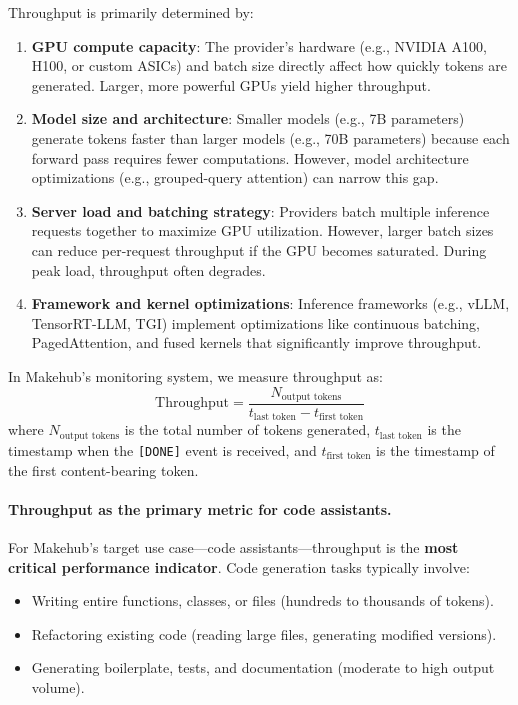 \documentclass[english]{article}
\begin{document}
Throughput is primarily determined by:
\begin{enumerate}
    \item \textbf{GPU compute capacity}: The provider's hardware (e.g., NVIDIA A100, H100, or custom ASICs) and batch size directly affect how quickly tokens are generated. Larger, more powerful GPUs yield higher throughput.
    \item \textbf{Model size and architecture}: Smaller models (e.g., 7B parameters) generate tokens faster than larger models (e.g., 70B parameters) because each forward pass requires fewer computations. However, model architecture optimizations (e.g., grouped-query attention) can narrow this gap.
    \item \textbf{Server load and batching strategy}: Providers batch multiple inference requests together to maximize GPU utilization. However, larger batch sizes can reduce per-request throughput if the GPU becomes saturated. During peak load, throughput often degrades.
    \item \textbf{Framework and kernel optimizations}: Inference frameworks (e.g., vLLM, TensorRT-LLM, TGI) implement optimizations like continuous batching, PagedAttention, and fused kernels that significantly improve throughput.
\end{enumerate}

In Makehub's monitoring system, we measure throughput as:
\[
\text{Throughput} = \frac{N_{\text{output tokens}}}{t_{\text{last token}} - t_{\text{first token}}}
\]
where $N_{\text{output tokens}}$ is the total number of tokens generated, $t_{\text{last token}}$ is the timestamp when the \texttt{[DONE]} event is received, and $t_{\text{first token}}$ is the timestamp of the first content-bearing token.

\paragraph{Throughput as the primary metric for code assistants.}

For Makehub's target use case—code assistants—throughput is the \textbf{most critical performance indicator}. Code generation tasks typically involve:
\begin{itemize}
    \item Writing entire functions, classes, or files (hundreds to thousands of tokens).
    \item Refactoring existing code (reading large files, generating modified versions).
    \item Generating boilerplate, tests, and documentation (moderate to high output volume).
\end{itemize}
\end{document}
